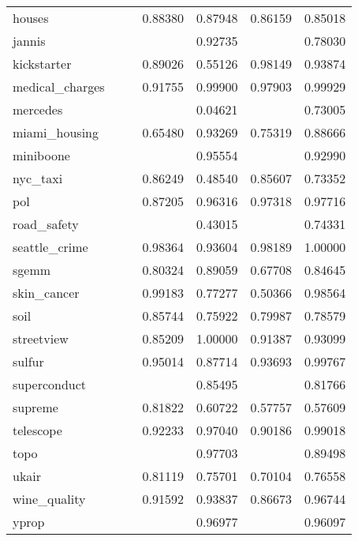 \begin{tabular}{lrrrrrr}
houses &  &  & 0.88380 & 0.87948 & 0.86159 & 0.85018 \\
jannis &  &  &  & 0.92735 &  & 0.78030 \\
kickstarter &  &  & 0.89026 & 0.55126 & 0.98149 & 0.93874 \\
medical_charges &  &  & 0.91755 & 0.99900 & 0.97903 & 0.99929 \\
mercedes &  &  &  & 0.04621 &  & 0.73005 \\
miami_housing &  &  & 0.65480 & 0.93269 & 0.75319 & 0.88666 \\
miniboone &  &  &  & 0.95554 &  & 0.92990 \\
nyc_taxi &  &  & 0.86249 & 0.48540 & 0.85607 & 0.73352 \\
pol &  &  & 0.87205 & 0.96316 & 0.97318 & 0.97716 \\
road_safety &  &  &  & 0.43015 &  & 0.74331 \\
seattle_crime &  &  & 0.98364 & 0.93604 & 0.98189 & 1.00000 \\
sgemm &  &  & 0.80324 & 0.89059 & 0.67708 & 0.84645 \\
skin_cancer &  &  & 0.99183 & 0.77277 & 0.50366 & 0.98564 \\
soil &  &  & 0.85744 & 0.75922 & 0.79987 & 0.78579 \\
streetview &  &  & 0.85209 & 1.00000 & 0.91387 & 0.93099 \\
sulfur &  &  & 0.95014 & 0.87714 & 0.93693 & 0.99767 \\
superconduct &  &  &  & 0.85495 &  & 0.81766 \\
supreme &  &  & 0.81822 & 0.60722 & 0.57757 & 0.57609 \\
telescope &  &  & 0.92233 & 0.97040 & 0.90186 & 0.99018 \\
topo &  &  &  & 0.97703 &  & 0.89498 \\
ukair &  &  & 0.81119 & 0.75701 & 0.70104 & 0.76558 \\
wine_quality &  &  & 0.91592 & 0.93837 & 0.86673 & 0.96744 \\
yprop &  &  &  & 0.96977 &  & 0.96097 \\
\bottomrule
\end{tabular}
